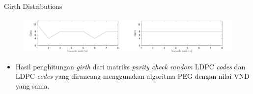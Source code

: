 \documentclass[11pt, aspectratio=169]{beamer}
\begin{document}
\begin{frame}{Girth Distributions}

	\begin{figure}
	\centering 
	\includegraphics[scale=0.45]{gambarafa/girthdisemua}
	\centering 
	
	
\end{figure}
\begin{itemize}
	\item Hasil penghitungan \textit{girth} dari matriks \textit{parity check random} LDPC \textit{codes} dan LDPC \textit{codes} yang dirancang menggunakan algoritma PEG dengan nilai VND yang sama. 
\end{itemize}

\end{frame}
\end{document}
